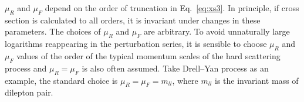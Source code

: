 $\mu_{R}$ and $\mu_{F}$ depend on the order of truncation in Eq.~\ref{eq:xs3}.
In principle, if cross section is calculated to all orders, it is invariant under changes in these parameters.
The choices of $\mu_{R}$ and $\mu_{F}$ are arbitrary. 
To avoid unnaturally large logarithms reappearing in the perturbation series,
it is sensible to choose $\mu_{R}$ and $\mu_{F}$ values of the order of the typical momentum scales of
the hard scattering process and $\mu_{R} = \mu_{F}$ is also often assumed.
Take Drell–Yan process as an example, the standard choice is $\mu_{R} = \mu_{F} = m_{ll}$, 
where $m_{ll}$ is the invariant mass of dilepton pair.
